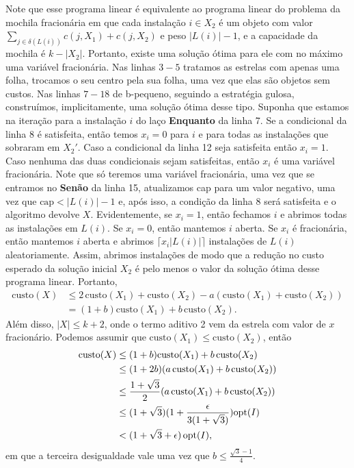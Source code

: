 Note que esse programa linear é equivalente ao programa linear do problema da mochila fracionária em que cada instalação $i \in X_2$ é um objeto com valor ${\sum_{j \in \delta(L(i))} c(j,X_1) + c(j,X_2)}$ e peso $|L(i)| - 1$, e a capacidade da mochila é $k - |X_2|$. Portanto, existe uma solução ótima para ele com no máximo uma variável fracionária. Nas linhas $3-5$ tratamos as estrelas com apenas uma folha, trocamos o seu centro pela sua folha, uma vez que elas são objetos sem custos. Nas linhas $7-18$ de {\sc b-pequeno}, seguindo a estratégia gulosa, construímos, implicitamente, uma solução ótima desse tipo. Suponha que estamos na iteração para a instalação $i$ do laço {\bf Enquanto} da linha 7. Se a condicional da linha 8 é satisfeita, então temos $x_i = 0$ para $i$ e para todas as instalações que sobraram em $X_2'$. Caso a condicional da linha 12 seja satisfeita então $x_i = 1$. Caso nenhuma das duas condicionais sejam satisfeitas, então $x_i$ é uma variável fracionária. Note que só teremos uma variável fracionária, uma vez que se entramos no {\bf Senão} da linha 15, atualizamos cap para um valor negativo, uma vez que $\text{cap} < |L(i)| - 1$ e, após isso, a condição da linha 8 será satisfeita e o algoritmo devolve $X$. Evidentemente, se $x_i = 1$, então fechamos $i$ e abrimos todas as instalações em $L(i)$. Se $x_i = 0$, então mantemos $i$ aberta. Se $x_i$ é fracionária, então mantemos $i$ aberta e abrimos $\lceil x_i |L(i)|\rceil$ instalações de $L(i)$ aleatoriamente. Assim, abrimos instalações de modo que a redução no custo esperado da solução inicial $X_2$ é pelo menos o valor da solução ótima desse programa linear. Portanto, 
\begin{align}
    \text{custo}(X) &\leq 2\,\text{custo}(X_1) + \text{custo}(X_2) - a (\text{custo}(X_1) + \text{custo}(X_2)) \nonumber \\
    &= (1 + b)\text{custo}(X_1) + b\,\text{custo}(X_2). \nonumber
\end{align}
Além disso, $|X| \leq k + 2$, onde o termo aditivo 2 vem da estrela com valor de $x$ fracionário.
Podemos assumir que $\text{custo}(X_1) \leq \text{custo}(X_2)$, então
\begin{align}
    \text{custo}(X) &\leq (1+b) \text{custo}(X_1) + b\,\text{custo}(X_2) \nonumber \\
    &\leq (1+2b)(a\,\text{custo}(X_1) + b\,\text{custo}(X_2)) \nonumber \\
    &\leq \frac{1 + \sqrt{3}}{2} (a\,\text{custo}(X_1) + b\,\text{custo}(X_2))\nonumber\\
    &\leq (1 + \sqrt{3}) (1 + \frac{\epsilon}{3(1 + \sqrt{3})}) \mathrm{opt}(I)\nonumber\\
    &< (1 +\sqrt{3} + \epsilon)\,\mathrm{opt}(I), \nonumber
\end{align}
em que a terceira desigualdade vale uma vez que $b \leq \frac{\sqrt{3} - 1}{4}$.
\vspace{-0.3cm}
